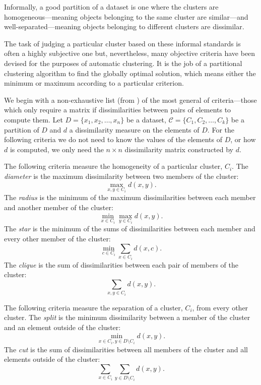 \documentclass[a4paper]{report}
\newcommand{\dset}{D}
\newcommand{\clus}{\mathcal{C}}
\begin{document}
Informally, a good partition of a dataset is one where the clusters are
homogeneous---meaning objects belonging to the same cluster are similar---and
well-separated---meaning objects belonging to different clusters are
dissimilar.

The task of judging a particular cluster based on these informal standards is
often a highly subjective one but, nevertheless, many objective criteria have
been devised for the purposes of automatic clustering.  It is the job of a
partitional clustering algorithm to find the globally optimal solution, which
means either the minimum or maximum according to a particular criterion.

We begin with a non-exhaustive list (from \citep{hansen1997mathprog}) of the
most general of criteria---those which only require a matrix if
dissimilarities between pairs of elements to compute them.  Let $\dset =
\{x_1,x_2,\dotsc,x_n\}$ be a dataset, $\clus = \{C_1,C_2,\dotsc,C_k\}$ be a
partition of $\dset$ and $d$ a dissimilarity measure on the elements of
$\dset$.  For the following criteria we do not need to know the values of the
elements of $\dset$, or how $d$ is computed, we only need the $n \times n$
dissimilarity matrix constructed by $d$.

The following criteria measure the homogeneity of a particular cluster, $C_i$.
The \textit{diameter} is the maximum dissimilarity between two members of the
cluster:
\begin{equation*}
  \max_{x,y \in C_i} d(x,y).
\end{equation*}
The \textit{radius} is the minimum of the maximum dissimilarities between each
member and another member of the cluster:
\begin{equation*}
  \min_{x \in C_i} \max_{y \in C_i} d(x,y).
\end{equation*}
The \textit{star} is the minimum of the sums of dissimilarities between each
member and every other member of the cluster:
\begin{equation*}
  \min_{c \in C_i} \sum_{x \in C_i} d(x,c).
\end{equation*}
The \textit{clique} is the sum of dissimilarities between each pair of members
of the cluster:
\begin{equation*}
  \sum_{x,y \in C_i} d(x,y).
\end{equation*}

The following criteria measure the separation of a cluster, $C_i$, from every
other cluster.  The \textit{split} is the minimum dissimilarity between a
member of the cluster and an element outside of the cluster:
\begin{equation*}
  \min_{x \in C_i, y \in \dset \setminus C_i} d(x,y).
\end{equation*}
The \textit{cut} is the sum of dissimilarities between all members of the
cluster and all elements outside of the cluster:
\begin{equation*}
  \sum_{x \in C_i} \sum_{y \in \dset \setminus C_i} d(x,y).
\end{equation*}
\end{document}
